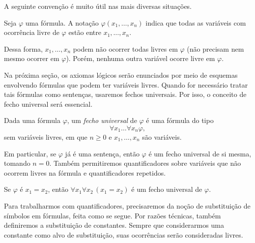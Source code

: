 A seguinte convenção é muito útil nas mais diversas situações.

\begin{convention}\label{conv:variaveisLivres}
    Seja $\varphi$ uma fórmula.
    A notação $\varphi(x_1, \dots, x_n)$ indica que todas as variáveis com ocorrência livre de $\varphi$ estão entre $x_1, \dots, x_n$.

    Dessa forma, $x_1, \dots, x_n$ podem não ocorrer todas livres em $\varphi$ (não precisam nem mesmo ocorrer em $\varphi$).
    Porém, nenhuma outra variável ocorre livre em $\varphi$.
\end{convention}

Na próxima seção, os axiomas lógicos serão enunciados por meio de esquemas envolvendo fórmulas que podem ter variáveis livres.
Quando for necessário tratar tais fórmulas como sentenças, usaremos fechos universais.
Por isso, o conceito de fecho universal será essencial.

\begin{metadefinition}\label{mdef:fechoUniversal}
    Dada uma fórmula $\varphi$, um \emph{fecho universal} de $\varphi$ é uma fórmula do tipo
    \[
        \forall x_1 \dots \forall x_n \varphi,
    \]
    sem variáveis livres, em que $n\geq 0$ e $x_1,\dots,x_n$ são variáveis.

    Em particular, se $\varphi$ já é uma sentença, então $\varphi$ é um fecho universal de si mesma, tomando $n=0$.
    Também permitiremos quantificadores sobre variáveis que não ocorrem livres na fórmula e quantificadores repetidos.
\end{metadefinition}

\begin{example}\label{exa:fechoUniversal}
    Se $\varphi$ é $x_1 = x_2$, então $\forall x_1 \forall x_2 \,(x_1 = x_2)$ é um fecho universal de $\varphi$.
\end{example}

Para trabalharmos com quantificadores, precisaremos da noção de substituição de símbolos em fórmulas, feita como se segue.
Por razões técnicas, também definiremos a substituição de constantes.
Sempre que considerarmos uma constante como alvo de substituição, suas ocorrências serão consideradas livres.

